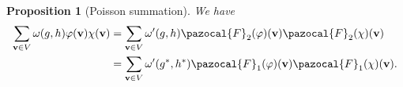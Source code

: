 \documentclass[a4paper,11pt]{amsart} %
\newcommand{\8}{\infty}
\newcommand{\vbf}{\mathbf{v}}
\newcommand{\four}{\pazocal{F}}
\newcommand{\SL}{\mathrm{SL}}
\newcommand{\GL}{\mathrm{GL}}
\newcommand{\phitil}{\widetilde{\phi}}
\newcommand{\R}{\mathbb{R}}
\newcommand{\Lcal}{\pazocal{L}}
\theoremstyle{mytheoremstyle}
\newtheorem{prop}[thm]{Proposition}
\theoremstyle{remark}
\numberwithin{equation}{section}
\begin{document}
\begin{prop}[Poisson summation] We have
    \begin{align}
\sum_{\vbf \in  V} \omega(g,h)\varphi(\vbf)\chi(\vbf) & =\sum_{\vbf \in  V} \omega'(g,h)\four_2(\varphi)(\vbf)\four_2(\chi)(\vbf) \\
& =\sum_{\vbf \in  V} \omega'(g^\ast,h^\ast)\four_1(\varphi)(\vbf)\four_1(\chi)(\vbf).
\end{align}
\end{prop}
%
%
%
\end{document}
